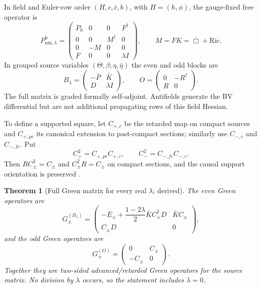\documentclass[11pt]{article}
\newtheorem{theorem}{Theorem}[section]
\theoremstyle{definition}
\theoremstyle{remark}
\newcommand{\cbar}{\bar c}
\begin{document}
In field and Euler-row order $(H,c,\cbar,b)$, with $H=(h,\phi)$, the gauge-fixed free
operator is
\begin{equation}
 P_{\mathrm{nm},\lambda}^{\mathrm{b}}=
 \begin{pmatrix}
 P_0&0&0&F^\dagger\\
 0&0&M^\dagger&0\\
 0&-M&0&0\\
 F&0&0&\lambda I
 \end{pmatrix},
 \qquad M=FK=\bar\Box+\mathrm{Ric}.
 \label{eq:PnmLB}
\end{equation}
In grouped source variables $(\Theta,\beta;\eta,\bar\eta)$ the even and odd blocks are
\begin{equation}
 B_\lambda=
 \begin{pmatrix}-\bar P&\bar K\\D&\lambda I\end{pmatrix},
 \qquad
 O=\begin{pmatrix}0&-R^\dagger\\R&0\end{pmatrix}.
 \label{eq:sourceblocks}
\end{equation}
The full matrix is graded formally self-adjoint.  Antifields generate the BV
differential but are not additional propagating rows of this field Hessian.

To define a supported square, let $C_{+,c}$ be the retarded map on compact sources and
$C_{+,pc}$ its canonical extension to past-compact sections; similarly use
$C_{-,c}$ and $C_{-,fc}$.  Put
\begin{equation}
 C_+^2=C_{+,pc}C_{+,c},
 \qquad C_-^2=C_{-,fc}C_{-,c}.
 \label{eq:C2}
\end{equation}
Then $RC_\pm^2=C_\pm$ and $C_\pm^2R=C_\pm$ on compact sections, and the causal
support orientation is preserved \cite{Baer2015}.

\begin{theorem}[Full Green matrix for every real $\lambda$; derived]
The even Green operators are
\begin{equation}
 G_\pm^{(B_\lambda)}=
 \begin{pmatrix}
 -E_\pm+\dfrac{1-2\lambda}{2}\bar K C_\pm^2D&\bar K C_\pm\\[2mm]
 C_\pm D&0
 \end{pmatrix},
 \label{eq:evenGreen}
\end{equation}
and the odd Green operators are
\begin{equation}
 G_\pm^{(O)}=
 \begin{pmatrix}0&C_\pm\\-C_\pm&0\end{pmatrix}.
 \label{eq:oddGreen}
\end{equation}
Together they are two-sided advanced/retarded Green operators for the source matrix.
No division by $\lambda$ occurs, so the statement includes $\lambda=0$.
\end{theorem}
\end{document}
